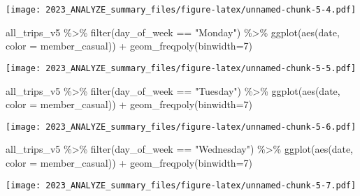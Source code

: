 \documentclass[
]{article}
\newenvironment{Shaded}{\begin{snugshade}}{\end{snugshade}}
\newcommand{\AttributeTok}[1]{\textcolor[rgb]{0.77,0.63,0.00}{#1}}
\newcommand{\DecValTok}[1]{\textcolor[rgb]{0.00,0.00,0.81}{#1}}
\newcommand{\FunctionTok}[1]{\textcolor[rgb]{0.00,0.00,0.00}{#1}}
\newcommand{\NormalTok}[1]{#1}
\newcommand{\SpecialCharTok}[1]{\textcolor[rgb]{0.00,0.00,0.00}{#1}}
\newcommand{\StringTok}[1]{\textcolor[rgb]{0.31,0.60,0.02}{#1}}
\begin{document}
\texttt{[image: 2023\_ANALYZE\_summary\_files/figure-latex/unnamed-chunk-5-4.pdf]}

\begin{Shaded}
\begin{Highlighting}[]
\NormalTok{all\_trips\_v5 }\SpecialCharTok{\%\textgreater{}\%} 
  \FunctionTok{filter}\NormalTok{(day\_of\_week }\SpecialCharTok{==} \StringTok{"Monday"}\NormalTok{) }\SpecialCharTok{\%\textgreater{}\%}
\FunctionTok{ggplot}\NormalTok{(}\FunctionTok{aes}\NormalTok{(date, }\AttributeTok{color =}\NormalTok{ member\_casual)) }\SpecialCharTok{+} 
  \FunctionTok{geom\_freqpoly}\NormalTok{(}\AttributeTok{binwidth=}\DecValTok{7}\NormalTok{)}
\end{Highlighting}
\end{Shaded}

\texttt{[image: 2023\_ANALYZE\_summary\_files/figure-latex/unnamed-chunk-5-5.pdf]}

\begin{Shaded}
\begin{Highlighting}[]
\NormalTok{all\_trips\_v5 }\SpecialCharTok{\%\textgreater{}\%} 
  \FunctionTok{filter}\NormalTok{(day\_of\_week }\SpecialCharTok{==} \StringTok{"Tuesday"}\NormalTok{) }\SpecialCharTok{\%\textgreater{}\%}
\FunctionTok{ggplot}\NormalTok{(}\FunctionTok{aes}\NormalTok{(date, }\AttributeTok{color =}\NormalTok{ member\_casual)) }\SpecialCharTok{+} 
  \FunctionTok{geom\_freqpoly}\NormalTok{(}\AttributeTok{binwidth=}\DecValTok{7}\NormalTok{)}
\end{Highlighting}
\end{Shaded}

\texttt{[image: 2023\_ANALYZE\_summary\_files/figure-latex/unnamed-chunk-5-6.pdf]}

\begin{Shaded}
\begin{Highlighting}[]
\NormalTok{all\_trips\_v5 }\SpecialCharTok{\%\textgreater{}\%} 
  \FunctionTok{filter}\NormalTok{(day\_of\_week }\SpecialCharTok{==} \StringTok{"Wednesday"}\NormalTok{) }\SpecialCharTok{\%\textgreater{}\%}
\FunctionTok{ggplot}\NormalTok{(}\FunctionTok{aes}\NormalTok{(date, }\AttributeTok{color =}\NormalTok{ member\_casual)) }\SpecialCharTok{+} 
  \FunctionTok{geom\_freqpoly}\NormalTok{(}\AttributeTok{binwidth=}\DecValTok{7}\NormalTok{)}
\end{Highlighting}
\end{Shaded}

\texttt{[image: 2023\_ANALYZE\_summary\_files/figure-latex/unnamed-chunk-5-7.pdf]}
\end{document}
